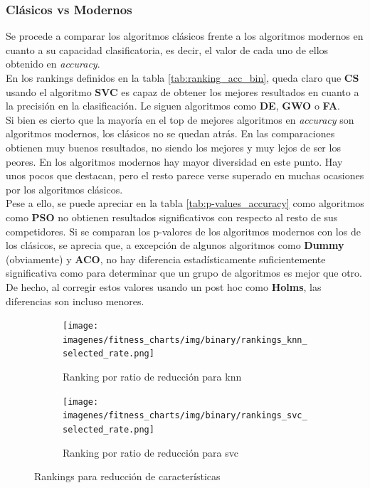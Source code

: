 \subsubsection{Clásicos vs Modernos}
Se procede a comparar los algoritmos clásicos frente a los algoritmos modernos en cuanto a su capacidad clasificatoria, es decir, el valor de cada uno de ellos obtenido en \textit{accuracy}.\\[6pt]

En los rankings definidos en la tabla \ref{tab:ranking_acc_bin}, queda claro que \textbf{CS} usando el algoritmo \textbf{SVC} es capaz de obtener los mejores resultados en cuanto a la precisión en la clasificación. Le siguen algoritmos como \textbf{DE}, \textbf{GWO} o \textbf{FA}.\\[6pt]

Si bien es cierto que la mayoría en el top de mejores algoritmos en \textit{accuracy} son algoritmos modernos, los clásicos no se quedan atrás. En las comparaciones obtienen muy buenos resultados, no siendo los mejores y muy lejos de ser los peores. En los algoritmos modernos hay mayor diversidad en este punto. Hay unos pocos que destacan, pero el resto parece verse superado en muchas ocasiones por los algoritmos clásicos.\\[6pt]

Pese a ello, se puede apreciar en la tabla \ref{tab:p-values_accuracy} como algoritmos como \textbf{PSO} no obtienen resultados significativos con respecto al resto de sus competidores. Si se comparan los p-valores de los algoritmos modernos con los de los clásicos, se aprecia que, a excepción de algunos algoritmos como \textbf{Dummy} (obviamente) y \textbf{ACO}, no hay diferencia estadísticamente suficientemente significativa como para determinar que un grupo de algoritmos es mejor que otro. De hecho, al corregir estos valores usando un post hoc como \textbf{Holms}, las diferencias son incluso menores.\\[6pt]

\begin{figure}[htb]
    \centering
    \begin{subfigure}[b]{1\textwidth}
        \texttt{[image: imagenes/fitness\_charts/img/binary/rankings\_knn\_selected\_rate.png]}
        \caption{Ranking por ratio de reducción para knn}
        \label{fig:ranking_knn_red}
    \end{subfigure}
    \begin{subfigure}[b]{1\textwidth}
        \texttt{[image: imagenes/fitness\_charts/img/binary/rankings\_svc\_selected\_rate.png]}
        \caption{Ranking por ratio de reducción para svc}
        \label{fig:ranking_svc_red}
    \end{subfigure}
    \caption{Rankings para reducción de características}
    \label{fig:rankings_red}
\end{figure}

